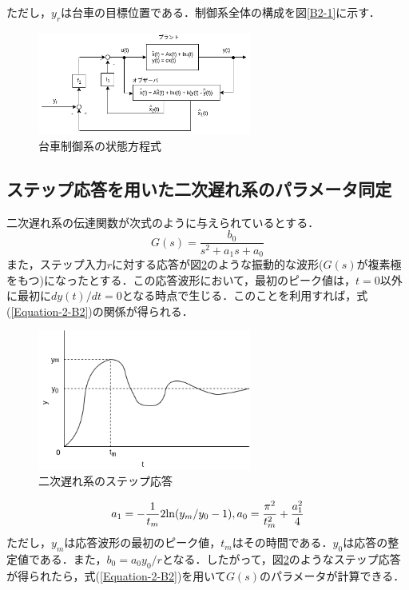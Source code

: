 \documentclass[12pt]{jsarticle}
\begin{document}
ただし，$y_r$は台車の目標位置である．制御系全体の構成を図\ref{B2-1}に示す．
\begin{figure}[tb]
  \begin{center}
    \includegraphics[clip,width=7.0cm]{../img/B2-2.png}
    \caption{台車制御系の状態方程式}
    \label{B2-2}
  \end{center}
\end{figure}
\subsection{ステップ応答を用いた二次遅れ系のパラメータ同定}
二次遅れ系の伝達関数が次式のように与えられているとする．
\begin{equation}
  \label{Equation-2-B1}
  G(s) = \frac{b_0}{s^2+a_1s+a_0}
\end{equation}
また，ステップ入力$r$に対する応答が図\ref{Fig2-B1}のような振動的な波形($G(s)$が複素極をもつ)になったとする．この応答波形において，最初のピーク値は，$t=0$以外に最初に$dy(t)/dt = 0$となる時点で生じる．このことを利用すれば，式(\ref{Equation-2-B2})の関係が得られる．
\begin{figure}[tb]
  \begin{center}
    \includegraphics[clip,width=7.0cm]{../img/2-B1.png}
    \caption{二次遅れ系のステップ応答}
    \label{Fig2-B1}
  \end{center}
\end{figure}
\begin{equation}
  \label{Equation-2-B2}
  a_1 = -\frac{1}{t_m}2{\rm ln}(y_m/y_0 -1),  a_0 = \frac{\pi^2}{t_m^2}+\frac{a_1^2}{4}
\end{equation}
ただし，$y_m$は応答波形の最初のピーク値，$t_m$はその時間である．$y_0$は応答の整定値である．また，$b_0=a_0y_0/r$となる．したがって，図\ref{Fig2-B1}のようなステップ応答が得られたら，式(\ref{Equation-2-B2})を用いて$G(s)$のパラメータが計算できる．
\end{document}
